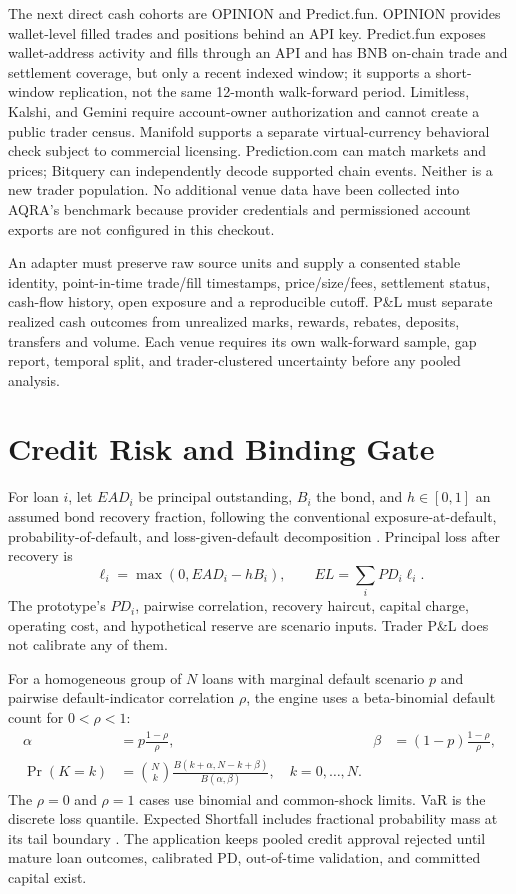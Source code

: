 \documentclass[conference]{IEEEtran}
\begin{document}
The next direct cash cohorts are OPINION and Predict.fun. OPINION provides wallet-level filled trades and positions behind an API key. Predict.fun exposes wallet-address activity and fills through an API and has BNB on-chain trade and settlement coverage, but only a recent indexed window; it supports a short-window replication, not the same 12-month walk-forward period. Limitless, Kalshi, and Gemini require account-owner authorization and cannot create a public trader census. Manifold supports a separate virtual-currency behavioral check subject to commercial licensing. Prediction.com can match markets and prices; Bitquery can independently decode supported chain events. Neither is a new trader population. No additional venue data have been collected into AQRA's benchmark because provider credentials and permissioned account exports are not configured in this checkout.

An adapter must preserve raw source units and supply a consented stable identity, point-in-time trade/fill timestamps, price/size/fees, settlement status, cash-flow history, open exposure and a reproducible cutoff. P\&L must separate realized cash outcomes from unrealized marks, rewards, rebates, deposits, transfers and volume. Each venue requires its own walk-forward sample, gap report, temporal split, and trader-clustered uncertainty before any pooled analysis.

\section{Credit Risk and Binding Gate}
For loan $i$, let $EAD_i$ be principal outstanding, $B_i$ the bond, and $h\in[0,1]$ an assumed bond recovery fraction, following the conventional exposure-at-default, probability-of-default, and loss-given-default decomposition \cite{basel-credit}. Principal loss after recovery is
\begin{equation}
\ell_i=\max(0,EAD_i-hB_i), \qquad EL=\sum_i PD_i\ell_i.
\end{equation}
The prototype's \(PD_i\), pairwise correlation, recovery haircut, capital charge, operating cost, and hypothetical reserve are scenario inputs. Trader P\&L does not calibrate any of them.

For a homogeneous group of $N$ loans with marginal default scenario $p$ and pairwise default-indicator correlation $\rho$, the engine uses a beta-binomial default count for $0<\rho<1$:
\begin{align}
\alpha &=p\frac{1-\rho}{\rho}, & \beta &=(1-p)\frac{1-\rho}{\rho},\\
\Pr(K=k)&={N\choose k}\frac{B(k+\alpha,N-k+\beta)}{B(\alpha,\beta)},\quad k=0,\ldots,N.
\end{align}
The $\rho=0$ and $\rho=1$ cases use binomial and common-shock limits. VaR is the discrete loss quantile. Expected Shortfall includes fractional probability mass at its tail boundary \cite{rockafellar-uryasev}. The application keeps pooled credit approval rejected until mature loan outcomes, calibrated PD, out-of-time validation, and committed capital exist.
\end{document}
